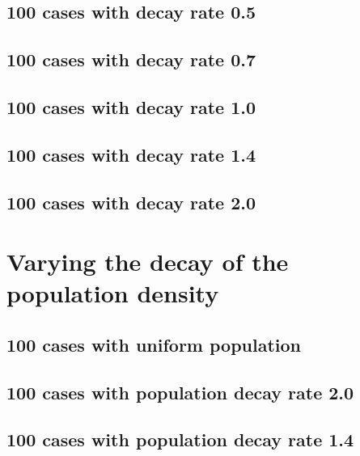 \subsection{100 cases with decay rate 0.5}


\subsection{100 cases with decay rate 0.7}


\subsection{100 cases with decay rate 1.0}


\subsection{100 cases with decay rate 1.4}


\subsection{100 cases with decay rate 2.0}


\section{Varying the decay of the population density}

\subsection{100 cases with uniform population}


\subsection{100 cases with population decay rate 2.0}


\subsection{100 cases with population decay rate 1.4}


